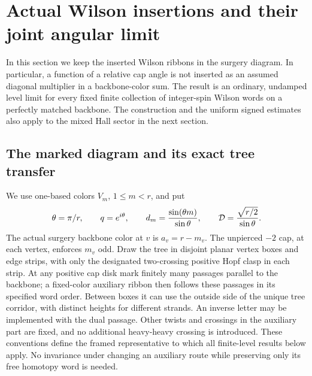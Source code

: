 \section{Actual Wilson insertions and their joint angular limit}
\label{sec:ang:main}

In this section we keep the inserted Wilson ribbons in the surgery diagram. In particular, a function of a relative cap angle is not inserted as an assumed diagonal multiplier in a backbone-color sum. The result is an ordinary, undamped level limit for every fixed finite collection of integer-spin Wilson words on a perfectly matched backbone. The construction and the uniform signed estimates also apply to the mixed Hall sector in the next section.

\subsection{The marked diagram and its exact tree transfer}

We use one-based colors \(V_m\), \(1\leq m<r\), and put
\[
 \theta=\pi/r,\qquad q=e^{i\theta},\qquad
 d_m=\frac{\sin(\theta m)}{\sin\theta},\qquad
 {\cal D}=\frac{\sqrt{r/2}}{\sin\theta}.
\]
The actual surgery backbone color at \(v\) is \(a_v=r-m_v\). The unpierced \(-2\) cap, at each vertex, enforces \(m_v\) odd. Draw the tree in disjoint planar vertex boxes and edge strips, with only the designated two-crossing positive Hopf clasp in each strip. At any positive cap disk mark finitely many passages parallel to the backbone; a fixed-color auxiliary ribbon then follows these passages in its specified word order. Between boxes it can use the outside side of the unique tree corridor, with distinct heights for different strands. An inverse letter may be implemented with the dual passage. Other twists and crossings in the auxiliary part are fixed, and no additional heavy-heavy crossing is introduced. These conventions define the framed representative to which all finite-level results below apply. No invariance under changing an auxiliary route while preserving only its free homotopy word is needed.

